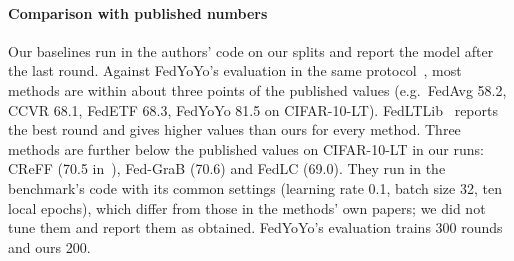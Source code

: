 \paragraph{Comparison with published numbers} Our baselines run in the authors' code on our splits and report the
model after the last round. Against FedYoYo's evaluation in the same protocol~\cite{yan2025fedyoyo}, most methods are within about three points of the published values (e.g.\ FedAvg 58.2, CCVR 68.1,
FedETF 68.3, FedYoYo 81.5 on CIFAR-10-LT). FedLTLib~\cite{lin2026fedltlib} reports the best round and gives higher
values than ours for every method. Three methods are further below the published values on CIFAR-10-LT in our runs: CReFF
(70.5 in~\cite{yan2025fedyoyo}), Fed-GraB (70.6) and FedLC (69.0). They run in the benchmark's code with its common
settings (learning rate 0.1, batch size 32, ten local epochs), which differ from those in the methods' own papers; we
did not tune them and report them as obtained. FedYoYo's evaluation trains 300 rounds and ours 200.

\begin{widetable}[t]
\centering\small
\caption{Balanced accuracy (\%) with one ResNet-8 shared by all clients (FedLTLib protocol: 20 clients, 40\% per
round, 200 rounds, Dirichlet $\alpha=0.5$); mean $\pm$ standard deviation over the seeds that completed (seeds
3--5; a value without $\pm$ is from one seed). Baselines in the authors' LongTailLib code on the same client splits,
evaluated after the last round; \ours with its readout and, separately, its heads only. Fed-GraB: accuracy of its own trained classifier as logged by the library.}
\label{tab:shared}
\end{widetable}



